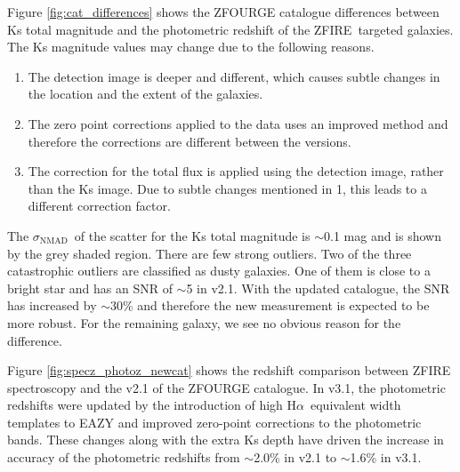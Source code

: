 \documentclass[iop]{emulateapj}
\newcommand{\Halpha}{H$\alpha$}
\newcommand{\around}{$\sim$}
\newcommand{\NMAD}{$\sigma_{\mathrm{NMAD}}$}
\begin{document}
Figure \ref{fig:cat_differences} shows the ZFOURGE catalogue differences between Ks total magnitude and the photometric redshift of the ZFIRE\ targeted galaxies. 
The Ks magnitude values may change due to the following reasons. 
\begin{enumerate}
\item The detection image is deeper and different, which causes subtle changes in the location and the extent of the galaxies. 
\item The zero point corrections applied to the data uses an improved method and therefore the corrections are different between the versions. 
\item The correction for the total flux is applied using the detection image, rather than the Ks image. Due to subtle changes mentioned in 1,  this leads to a different correction factor. 
\end{enumerate}
The \NMAD\ of the scatter for the Ks total magnitude is \around0.1 mag and is shown by the grey shaded region. There are few strong outliers. 
Two of the three catastrophic outliers are classified as dusty galaxies. One of them is close to a bright star and has an SNR of \around5 in v2.1. 
With the updated catalogue, the SNR has increased by \around30\% and therefore the new measurement is expected to be more robust.  
For the remaining galaxy, we see no obvious reason for the difference. 


Figure  \ref{fig:specz_photoz_newcat} shows the redshift comparison between ZFIRE spectroscopy and the v2.1 of the ZFOURGE catalogue. In v3.1, the photometric redshifts were updated by the introduction of high \Halpha\ equivalent width templates to EAZY and improved zero-point corrections to the photometric bands.
These changes along with the extra Ks depth have driven the increase in accuracy of the photometric redshifts from \around2.0\% in v2.1 to \around1.6\% in v3.1. 
\end{document}
